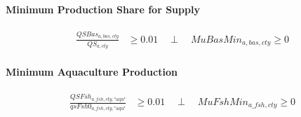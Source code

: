 \paragraph{Minimum Production Share for Supply}
\begin{align}
  \frac{QSBas_{a,bas,cty}}{QS_{a,cty}}
  &\ge 0.01
  \quad \perp \quad
  MuBasMin_{a,bas,cty} \ge 0
  \tag{QSBasMinEq}\label{eq:QSBasMinEq}
\end{align}

\paragraph{Minimum Aquaculture Production}
\begin{align}
  \frac{QSFsh_{a\_fsh,cty,\text{"aqu"}}}{qsFsh0_{a\_fsh,cty,\text{"aqu"}}}
  &\ge 0.01
  \quad \perp \quad
  MuFshMin_{a\_fsh,cty} \ge 0
  \tag{QSFshMinEq}\label{eq:QSFshMinEq}
\end{align}
